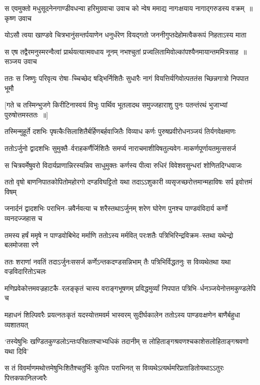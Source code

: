 \threelineshloka
{स एवमुक्तो मधुसूदनेनगाण्डीवधन्वा हरिमुग्रवाचा}
{उवाच को न्वेष ममाद्य नागःक्षयाय नागाद्गरुडस्य वक्रम् ॥कृष्ण उवाच}
{}


\twolineshloka
{योऽसौ त्वया खाण्डवे चित्रभानुंसन्तर्पयाणेन धनुर्धरेण}
{वियद्गतो जननीगुप्तदेहोमत्वैकरूपं निहताऽस्य माता}


\threelineshloka
{स एष तद्वैरमनुस्मरन्वैत्वां प्रार्थयत्यात्मवधाय नूनम्}
{नभश्चुतां प्रज्वलितामिवोल्कांपश्यैनमायान्तममित्रसाह ॥सञ्जय उवाच}
{}


\twolineshloka
{ततः स जिष्णुः परिवृत्य रोषा--च्चिच्छेद षड्भिर्निशितैः सुधारैः}
{नागं वियत्तिर्यगिवोत्पततंस च्छिन्नगात्रो निपपात भूमौ}


\twolineshloka
{[गते च तस्मिन्भुजगे किरीटिनास्वयं विभुः पार्थिव भूतलादथ}
{समुज्जहाराशु पुनः पतन्तंरथं भुजाभ्यां पुरुषोत्तमस्ततः ॥]}


\twolineshloka
{तस्मिन्मुहूर्ते दशभिः पृषत्कैःसिलाशितैर्बर्हिणबर्हवाजितैः}
{विव्याध कर्णः पुरुषप्रवीरोधनञ्जयं तिर्यगवेक्षमाणः}


\twolineshloka
{ततोऽर्जुनो द्वादशभिः सुमुक्तै--र्वराहकर्णैर्जिशितैः समर्प्य}
{नाराचमाशीविषतुल्यवेग--माकर्णपूर्णायतमुत्ससर्ज}


\twolineshloka
{स चित्रवर्मेषुवरो विदार्यप्राणान्निरस्यन्निव साधुमुक्तः}
{कर्णस्य पीत्वा रुधिरं विवेशवसुन्धरां शोणितदिग्धवाजः}


\twolineshloka
{ततो वृषो बाणनिपातकोपितोमहोरगो दण्डविघट्टितो यथा}
{तदाऽऽशुकारी व्यसृजच्छरोत्तमान्महाविषः सर्प इवोत्तमं विषम्}


\twolineshloka
{जनार्दनं द्वादशभिः पराभिन--न्नवैर्नवत्या च शरैस्तथाऽर्जुनम्}
{शरेण घोरेण पुनश्च पाण्डवंविदार्य कर्णो व्यनदज्जहास च}


\twolineshloka
{तमस्य हर्षं ममृषे न पाण्डवोबिभेद मर्माणि ततोऽस्य मर्मवित्}
{परःशतैः पत्रिभिरिन्द्रविक्रम--स्तथा यथेन्द्रो बलमोजसा रणे}


\twolineshloka
{ततः शराणां नवतिं तदाऽर्जुनःससर्ज कर्णेऽन्तकदण्डसन्निभाम्}
{तैः पत्रिभिर्विद्धतनुः स विव्यथेतथा यथा वज्रविदारितोऽचलः}


\twolineshloka
{मणिप्रवेकोत्तमवज्रहाटकै--रलङ्कृतं चास्य वराङ्गभूषणम्}
{प्रविद्धमुर्व्यां निपपात पत्रिभि--र्धनञ्जयेनोत्तमकुण्डलेपि च}


\twolineshloka
{महाधनं शिल्पिवरैः प्रयत्नतःकृतं यदस्योत्तमवर्म भास्वरम्}
{सुदीर्घकालेन ततोऽस्य पाण्डवःक्षणेन बाणैर्बहुधा व्यशातयत्}


\twolineshloka
{`तस्येषुभिः खण्डितकुण्डलोऽन्तःपरिक्षतश्चाभ्यधिकं तदानीम्}
{स लोहिताङ्गश्रवणश्चकाशेसलोहिताङ्गश्रवणो यथा दिवि'}


\twolineshloka
{स तं विवर्माणमथोत्तमेषुभिःशितैश्चतुर्भिः कुपितः पराभिनत्}
{स विव्यथेऽत्यर्थमरिप्रताडितोयथाऽऽतुरः पित्तकफानिलज्वरैः}


